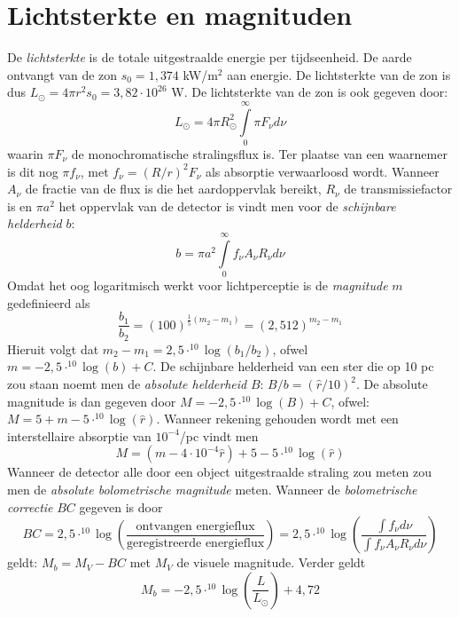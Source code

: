 \documentclass[twoside]{report}
\begin{document}
\section{Lichtsterkte en magnituden}
De {\it lichtsterkte} is de totale uitgestraalde energie per tijdseenheid.
De aarde ontvangt van de zon $s_0=1,374$ kW/m$^2$ aan energie. De
lichtsterkte van de zon is dus $L_\odot=4\pi r^2s_0=3,82\cdot10^{26}$ W. De
lichtsterkte van de zon is ook gegeven door:
\[
L_\odot=4\pi R_\odot^2\int\limits_0^\infty \pi F_\nu d\nu
\]
waarin $\pi F_\nu$ de monochromatische stralingsflux is. Ter plaatse van een
waarnemer is dit nog $\pi f_\nu$, met $f_\nu=(R/r)^2F_\nu$ als absorptie
verwaarloosd wordt. Wanneer $A_\nu$ de fractie van de flux is die het
aardoppervlak bereikt, $R_\nu$ de transmissiefactor is en $\pi a^2$ het
oppervlak van de detector is vindt men voor de {\it schijnbare helderheid} $b$:
\[
b=\pi a^2\int\limits_0^\infty f_\nu A_\nu R_\nu d\nu
\]
Omdat het oog logaritmisch werkt voor lichtperceptie is de {\it magnitude}
$m$ gedefinieerd als
\[
\frac{b_1}{b_2}=(100)^{\frac{1}{5}(m_2-m_1)}=(2,512)^{m_2-m_1}
\]
Hieruit volgt dat $m_2-m_1=2,5\cdot^{10}\log(b_1/b_2)$, ofwel $m=-2,5\cdot^{10}\log(b)+C$.
De schijnbare helderheid van een ster die op 10 pc zou staan noemt men de
{\it absolute helderheid} $B$: $B/b=(\hat{r}/10)^2$. De absolute magnitude is
dan gegeven door $M=-2,5\cdot^{10}\log(B)+C$, ofwel:
$M=5+m-5\cdot^{10}\log(\hat{r})$. Wanneer rekening gehouden wordt met een
interstellaire absorptie van $10^{-4}$/pc vindt men
\[
M=(m-4\cdot10^{-4}\hat{r})+5-5\cdot^{10}\log(\hat{r})
\]
Wanneer de detector alle door een object uitgestraalde straling zou meten zou
men de {\it absolute bolometrische magnitude} meten. Wanneer de
{\it bolometrische correctie} $BC$ gegeven is door
\[
BC=2,5\cdot^{10}\log\left(\frac{\mbox{ontvangen energieflux}}{\mbox{geregistreerde energieflux}}\right)=
2,5\cdot^{10}\log\left(\frac{\int f_\nu d\nu}{\int f_\nu A_\nu R_\nu d\nu}\right)
\]
geldt: $M_b=M_V-BC$ met $M_V$ de visuele magnitude. Verder geldt
\[
M_b=-2,5\cdot^{10}\log\left(\frac{L}{L_\odot}\right)+4,72
\]
\end{document}

